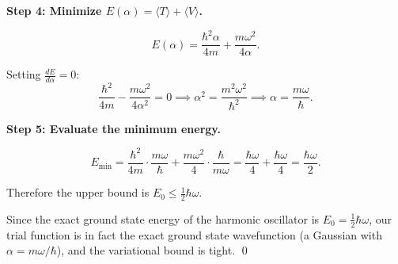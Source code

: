 \documentclass[12pt]{article}
\begin{document}
\textbf{Step 4: Minimize $E(\alpha) = \langle T\rangle + \langle V\rangle$.}

\[
E(\alpha) = \frac{\hbar^2\alpha}{4m} + \frac{m\omega^2}{4\alpha}.
\]

Setting $\frac{dE}{d\alpha} = 0$:
\[
\frac{\hbar^2}{4m} - \frac{m\omega^2}{4\alpha^2} = 0 \implies \alpha^2 = \frac{m^2\omega^2}{\hbar^2} \implies \alpha = \frac{m\omega}{\hbar}.
\]

\textbf{Step 5: Evaluate the minimum energy.}

\[
E_{\min} = \frac{\hbar^2}{4m}\cdot\frac{m\omega}{\hbar} + \frac{m\omega^2}{4}\cdot\frac{\hbar}{m\omega} = \frac{\hbar\omega}{4} + \frac{\hbar\omega}{4} = \frac{\hbar\omega}{2}.
\]

Therefore the upper bound is $E_0 \leq \frac{1}{2}\hbar\omega$.

Since the exact ground state energy of the harmonic oscillator is $E_0 = \frac{1}{2}\hbar\omega$, our trial function is in fact the exact ground state wavefunction (a Gaussian with $\alpha = m\omega/\hbar$), and the variational bound is tight. \qed
\end{document}
